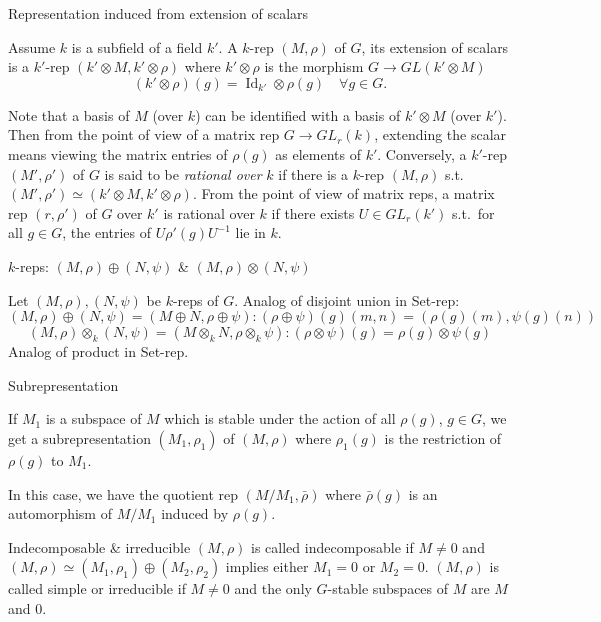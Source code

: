 \documentclass[11pt, a4paper]{report}
\begin{document}
\begin{definition}
Representation induced from extension of scalars

Assume $k$ is a subfield of a field $k'$. A $k$-rep $(M, \rho)$ of $G$, its extension of scalars is a $k'$-rep $(k' \otimes M, k' \otimes \rho)$ where $k' \otimes \rho$ is the morphism $G \to GL(k' \otimes M)$
\[
(k' \otimes \rho)(g) = \operatorname{Id}_{k'} \otimes \rho(g) \quad \forall g \in G.
\]

Note that a basis of $M$ (over $k$) can be identified with a basis of $k' \otimes M$ (over $k'$). Then from the point of view of a matrix rep $G \to GL_r(k)$, extending the scalar means viewing the matrix entries of $\rho(g)$ as elements of $k'$. Conversely, a $k'$-rep $(M', \rho')$ of $G$ is said to be \emph{rational over} $k$ if there is a $k$-rep $(M, \rho)$ s.t.\ $(M', \rho') \simeq (k' \otimes M, k' \otimes \rho)$. From the point of view of matrix reps, a matrix rep $(r, \rho')$ of $G$ over $k'$ is rational over $k$ if there exists $U \in GL_r(k')$ s.t.\ for all $g \in G$, the entries of $U \rho'(g) U^{-1}$ lie in $k$.

\end{definition}

\begin{definition}
$k$-reps: $(M, \rho) \oplus (N, \psi)$ \& $(M, \rho) \otimes (N, \psi)$

Let $(M, \rho), (N, \psi)$ be $k$-reps of $G$. Analog of disjoint union in Set-rep:
\[
(M, \rho) \oplus (N, \psi) = (M \oplus N, \rho \oplus \psi): (\rho \oplus \psi)(g)(m, n) = (\rho(g)(m), \psi(g)(n))
\]
\[
(M, \rho) \otimes_k (N, \psi) = (M \otimes_k N, \rho \otimes_k \psi): (\rho \otimes \psi)(g) = \rho(g) \otimes \psi(g)
\]
Analog of product in Set-rep.

\end{definition}

\begin{definition}
Subrepresentation

If $M_1$ is a subspace of $M$ which is stable under the action of all $\rho(g)$, $g \in G$, we get a subrepresentation $(M_1, \rho_1)$ of $(M, \rho)$ where $\rho_1(g)$ is the restriction of $\rho(g)$ to $M_1$.

In this case, we have the quotient rep $(M/M_1, \bar{\rho})$ where $\bar{\rho}(g)$ is an automorphism of $M/M_1$ induced by $\rho(g)$.

\end{definition}

\begin{definition}
Indecomposable \& irreducible
$(M, \rho)$ is called indecomposable if $M \neq 0$ and $(M, \rho) \simeq\left(M_{1}, \rho_{1}\right) \oplus\left(M_{2}, \rho_{2}\right)$ implies either $M_{1}=0$ or $M_{2}=0$.
$(M, \rho)$ is called simple or irreducible if $M \neq 0$ and the only $G$-stable subspaces of $M$ are $M$ and $0$.

\end{definition}
\end{document}
